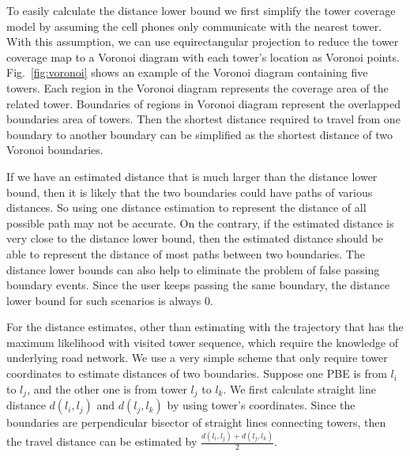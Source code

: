 To easily calculate the distance lower bound we first simplify the tower coverage model by assuming the cell phones only communicate with the nearest tower. With this assumption, we can use equirectangular projection to reduce the tower coverage map to a Voronoi diagram with each tower's location as Voronoi points. Fig.~\ref{fig:voronoi} shows an example of the Voronoi diagram containing five towers. Each region in the Voronoi diagram represents the coverage area of the related tower. Boundaries of regions in Voronoi diagram represent the overlapped boundaries area of towers. Then the shortest distance required to travel from one boundary to another boundary can be simplified as the shortest distance of two Voronoi boundaries. 

If we have an estimated distance that is much larger than the distance lower bound, then it is likely that the two boundaries could have paths of various distances. So using one distance estimation to represent the distance of all possible path may not be accurate. On the contrary, if the estimated distance is very close to the distance lower bound, then the estimated distance should be able to represent the distance of most paths between two boundaries. The distance lower bounds can also help to eliminate the problem of false passing boundary events. Since the user keeps passing the same boundary, the distance lower bound for such scenarios is always $0$. 

For the distance estimates, other than estimating with the trajectory that has the maximum likelihood with visited tower sequence, which require the knowledge of underlying road network. We use a very simple scheme that only require tower coordinates to estimate distances of two boundaries. Suppose one PBE is from $l_i$ to $l_j$, and the other one is from tower $l_j$ to $l_k$. We first calculate straight line distance $d(l_i,l_j)$ and $d(l_j,l_k)$ by using tower's coordinates. Since the boundaries are perpendicular bisector of straight lines connecting towers, then the travel distance can be estimated by $\frac{d(l_i,l_j) + d(l_j,l_k)}{2}$. 

